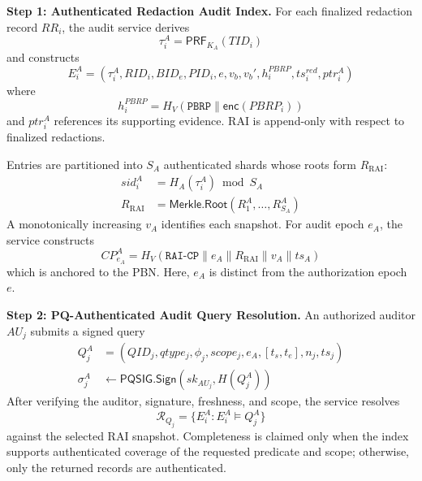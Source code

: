 \documentclass[lettersize,journal]{IEEEtran}
\begin{document}
\medskip
\noindent\textbf{Step 1: Authenticated Redaction Audit Index.}
For each finalized redaction record $RR_i$, the audit service derives
\begin{equation}
\tau_i^A=\mathsf{PRF}_{K_A}(TID_i)
\end{equation}
and constructs
\begin{equation}
E_i^A=
(\tau_i^A,RID_i,BID_e,PID_i,e,v_b,v_b',
h_i^{PBRP},ts_i^{red},ptr_i^A)
\end{equation}
where
\begin{equation}
h_i^{PBRP}
=
H_V(\texttt{PBRP}\parallel\mathsf{enc}(PBRP_i))
\end{equation}
and $ptr_i^A$ references its supporting evidence. RAI is append-only
with respect to finalized redactions.

Entries are partitioned into $S_A$ authenticated shards whose roots
form $R_{\mathrm{RAI}}$:
\begin{equation}
\begin{aligned}
sid_i^A&=H_A(\tau_i^A)\bmod S_A\\
R_{\mathrm{RAI}}&=\mathsf{Merkle.Root}(R_1^A,\ldots,R_{S_A}^A)
\end{aligned}
\end{equation}
A monotonically increasing $v_A$ identifies each snapshot. For audit
epoch $e_A$, the service constructs
\begin{equation}
CP_{e_A}^A
=
H_V(
\texttt{RAI-CP}\parallel e_A\parallel
R_{\mathrm{RAI}}\parallel v_A\parallel ts_A)
\label{eq:rai_cp}
\end{equation}
which is anchored to the PBN. Here, $e_A$ is distinct from the
authorization epoch $e$.

\medskip
\noindent\textbf{Step 2: PQ-Authenticated Audit Query Resolution.}
An authorized auditor $AU_j$ submits a signed query
\begin{equation}
\begin{aligned}
Q_j^A&=(QID_j,qtype_j,\phi_j,scope_j,e_A,[t_s,t_e],n_j,ts_j)\\
\sigma_j^A&\leftarrow\mathsf{PQSIG.Sign}(sk_{AU_j},H(Q_j^A))
\end{aligned}
\end{equation}
After verifying the auditor, signature, freshness, and scope, the
service resolves
\begin{equation}
\mathcal{R}_{Q_j}
=
\{E_i^A:E_i^A\models Q_j^A\}
\end{equation}
against the selected RAI snapshot. Completeness is claimed only when
the index supports authenticated coverage of the requested predicate
and scope; otherwise, only the returned records are authenticated.
\end{document}
